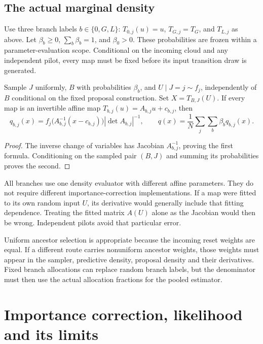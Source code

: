 \subsection{The actual marginal density}

Use three branch labels \(b\in\{0,G,L\}\):
\(T_{0,j}(u)=u\), \(T_{G,j}=T_G\), and \(T_{L,j}\) as above.
Let \(\beta_b\geq0\), \(\sum_b\beta_b=1\), and \(\beta_0>0\).
These probabilities are frozen within a parameter-evaluation scope.
Conditional on the incoming cloud and any independent pilot, every map
must be fixed before its input transition draw is generated.

\begin{proposition}
Sample \(J\) uniformly, \(B\) with probabilities \(\beta_b\), and
\(U\mid J=j\sim f_j\), independently of \(B\) conditional on the fixed
proposal construction. Set \(X=T_{B,J}(U)\). If every map is an invertible
affine map \(T_{b,j}(u)=A_{b,j}u+c_{b,j}\), then
\begin{equation}
\label{eq:bf-covariance-proposal-mapped-density}
 q_{b,j}(x)=
 f_j\bigl(A_{b,j}^{-1}(x-c_{b,j})\bigr)
 |\det A_{b,j}|^{-1},\qquad
 q(x)=\frac1N\sum_j\sum_b\beta_b q_{b,j}(x).
\end{equation}
\end{proposition}
\begin{proof}
The inverse change of variables has Jacobian \(A_{b,j}^{-1}\), proving
the first formula. Conditioning on the sampled pair \((B,J)\) and summing
its probabilities proves the second.
\end{proof}

All branches use one density evaluator with different affine parameters.
They do not require different importance-correction implementations.
If a map were fitted to its own random input \(U\), its derivative would
generally include that fitting dependence. Treating the fitted matrix
\(A(U)\) alone as the Jacobian would then be wrong. Independent pilots
avoid that particular error.

Uniform ancestor selection is appropriate because the incoming reset
weights are equal. If a different route carries nonuniform ancestor
weights, those weights must appear in the sampler, predictive density,
proposal density and their derivatives. Fixed branch allocations can
replace random branch labels, but the denominator must then use the
actual allocation fractions for the pooled estimator.

\section{Importance correction, likelihood and its limits}

